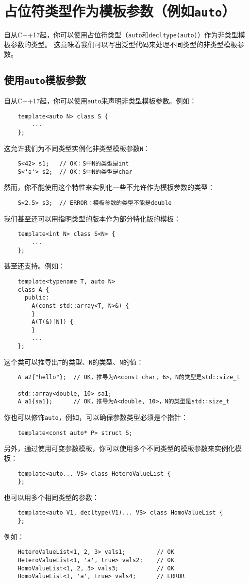 \chapter[占位符类型作为模板参数]{占位符类型作为模板参数（例如\texttt{auto}）}\label{ch13}
自从C++17起，你可以使用占位符类型（\texttt{auto}和\texttt{decltype(auto)}）作为非类型模板参数的类型。
这意味着我们可以写出泛型代码来处理不同类型的非类型模板参数。

\section{使用\texttt{auto}模板参数}\label{ch13.1}
自从C++17起，你可以使用\texttt{auto}来声明非类型模板参数。例如：
\begin{lstlisting}
    template<auto N> class S {
        ...
    };
\end{lstlisting}
这允许我们为不同类型实例化非类型模板参数\texttt{N}：
\begin{lstlisting}
    S<42> s1;   // OK：S中N的类型是int
    S<'a'> s2;  // OK：S中N的类型是char
\end{lstlisting}
然而，你不能使用这个特性来实例化一些不允许作为模板参数的类型：
\begin{lstlisting}
    S<2.5> s3;  // ERROR：模板参数的类型不能是double
\end{lstlisting}
我们甚至还可以用指明类型的版本作为部分特化版的模板：
\begin{lstlisting}
    template<int N> class S<N> {
        ...
    };
\end{lstlisting}
甚至还支持。例如：
\begin{lstlisting}
    template<typename T, auto N>
    class A {
      public:
        A(const std::array<T, N>&) {
        }
        A(T(&)[N]) {
        }
        ...
    };
\end{lstlisting}
这个类可以推导出\texttt{T}的类型、\texttt{N}的类型、\texttt{N}的值：
\begin{lstlisting}
    A a2{"hello"};  // OK，推导为A<const char, 6>，N的类型是std::size_t

    std::array<double, 10> sa1;
    A a1{sa1};      // OK，推导为A<double, 10>，N的类型是std::size_t
\end{lstlisting}
你也可以修饰\texttt{auto}，例如，可以确保参数类型必须是个指针：
\begin{lstlisting}
    template<const auto* P> struct S;
\end{lstlisting}
另外，通过使用可变参数模板，你可以使用多个不同类型的模板参数来实例化模板：
\begin{lstlisting}
    template<auto... VS> class HeteroValueList {
    };
\end{lstlisting}
也可以用多个相同类型的参数：
\begin{lstlisting}
    template<auto V1, decltype(V1)... VS> class HomoValueList {
    };
\end{lstlisting}
例如：
\begin{lstlisting}
    HeteroValueList<1, 2, 3> vals1;         // OK
    HeteroValueList<1, 'a', true> vals2;    // OK
    HomoValueList<1, 2, 3> vals3;           // OK
    HomoValueList<1, 'a', true> vals4;      // ERROR
\end{lstlisting}


